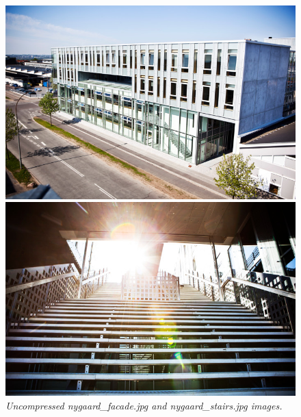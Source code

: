 \documentclass[a4paper,10pt,article,oneside,english]{memoir}
\let\oldcaption\caption
\renewcommand{\caption}[1]{\oldcaption{\emph{#1}}}
\begin{document}
\begin{figure}
	\centering
	\begin{minipage}{.49\textwidth}
		\includegraphics[width=\textwidth]{nygaard_facade.png}
	\end{minipage}
	\hfill
	\begin{minipage}{.49\textwidth}
		\includegraphics[width=\textwidth]{nygaard_stairs.png}
	\end{minipage}
	\caption{Uncompressed \emph{nygaard\_facade.jpg} and \emph{nygaard\_stairs.jpg} images.}
	\label{fig:uncomp}
\end{figure}
\end{document}
